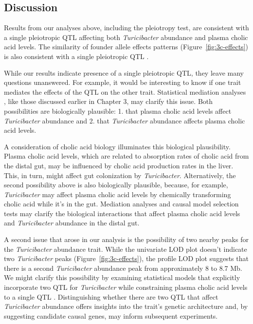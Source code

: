 \documentclass[oneside]{book}\usepackage[]{graphicx}\usepackage[]{color}
\begin{document}
\subsection{Discussion}

Results from our analyses above, including the pleiotropy test, are consistent with a 
single pleiotropic QTL affecting both \emph{Turicibacter} abundance 
and plasma cholic acid levels. 
The similarity of founder allele effects patterns (Figure~\ref{fig:3c-effects}) is 
also consistent with a single pleiotropic QTL \citep{king2012genetic,macdonald2007joint}. 

While our results indicate presence of a single pleiotropic QTL, 
they leave many questions unanswered. For example, 
it would be interesting to know if one trait mediates the effects of the QTL on the other trait. 
Statistical mediation analyses \citep{chick2016defining}, 
like those discussed earlier in Chapter 3, may clarify this issue.
Both possibilities are biologically plausible: 1. that plasma cholic acid levels affect \emph{Turicibacter} abundance
and 
2. that \emph{Turicibacter} abundance affects plasma cholic 
acid levels.

A consideration of cholic acid biology illuminates this biological plausibility. 
Plasma cholic acid levels, which are related to 
absorption rates of cholic acid from the distal gut, 
may be influenced by cholic acid production rates in the liver. 
This, in turn, might affect gut colonization by \emph{Turicibacter}. 
Alternatively, the second possibility above is also 
biologically plausible, because, for example, 
\emph{Turicibacter} may affect plasma cholic acid levels by 
chemically transforming cholic acid while it's in the gut. 
Mediation analyses and causal model selection tests \citep{neto2013modeling} may clarify 
the biological interactions that affect plasma cholic 
acid levels and \emph{Turicibacter} abundance in the distal gut.

A second issue that arose in our analysis is the possibility of two nearby peaks 
for the \emph{Turicibacter} abundance trait. 
While the univariate LOD plot doesn't indicate two \emph{Turicibacter} peaks (Figure~\ref{fig:3c-effects}), 
the profile LOD plot suggests that there is a second \emph{Turicibacter} abundance 
peak from approximately 8 to 8.7 Mb. 
We might clarify this possibility by examining statistical models that 
explicitly incorporate two QTL for 
\emph{Turicibacter} while constraining plasma cholic acid levels to 
a single QTL \citep{schadt2005integrative}. Distinguishing whether there are two QTL that 
affect \emph{Turicibacter} abundance offers insights into the trait's genetic architecture 
and, by suggesting candidate causal genes, may inform subsequent experiments.
\end{document}
